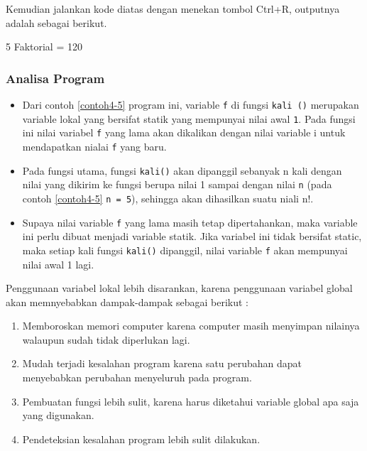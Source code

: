 Kemudian jalankan kode diatas dengan menekan tombol Ctrl+R, outputnya
adalah sebagai berikut.

\begin{lcverbatim}
5 Faktorial = 120
\end{lcverbatim} 

\subsubsection*{Analisa Program}

\begin{itemize}

\item
  Dari contoh \ref{contoh4-5} program ini, variable \texttt{f} di fungsi
  \texttt{kali\ ()} merupakan variable lokal yang bersifat statik yang
  mempunyai nilai awal \texttt{1}. Pada fungsi ini nilai variabel
  \texttt{f} yang lama akan dikalikan dengan nilai variable i untuk
  mendapatkan nialai \texttt{f} yang baru.\\
\item
  Pada fungsi utama, fungsi \texttt{kali()} akan dipanggil sebanyak n
  kali dengan nilai yang dikirim ke fungsi berupa nilai 1 sampai dengan
  nilai \texttt{n} (pada contoh \ref{contoh4-5} \texttt{n\ =\ 5}), sehingga akan
  dihasilkan suatu niali n!.\\
\item
  Supaya nilai variable \texttt{f} yang lama masih tetap dipertahankan,
  maka variable ini perlu dibuat menjadi variable statik. Jika variabel
  ini tidak bersifat static, maka setiap kali fungsi \texttt{kali()}
  dipanggil, nilai variable \texttt{f} akan mempunyai nilai awal 1 lagi.
\end{itemize}

Penggunaan variabel lokal lebih disarankan, karena penggunaan variabel
global akan memnyebabkan dampak-dampak sebagai berikut :

\begin{enumerate}


\item
  Memboroskan memori computer karena computer masih menyimpan nilainya
  walaupun sudah tidak diperlukan lagi.
\item
  Mudah terjadi kesalahan program karena satu perubahan dapat
  menyebabkan perubahan menyeluruh pada program.
\item
  Pembuatan fungsi lebih sulit, karena harus diketahui variable global
  apa saja yang digunakan.
\item
  Pendeteksian kesalahan program lebih sulit dilakukan.
\end{enumerate}

